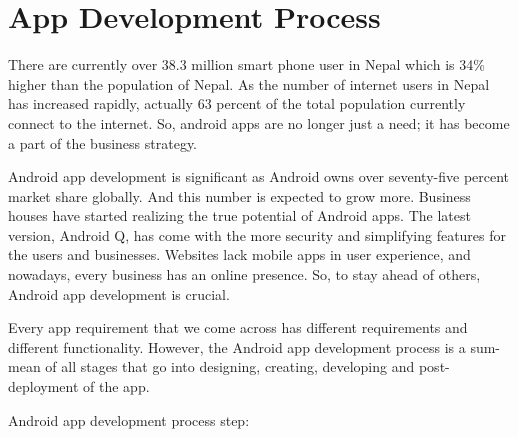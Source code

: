 \section{App Development Process}
There are currently over 38.3 million smart phone user in Nepal which is 34\% higher than the population of Nepal. As the number of internet users in Nepal has increased rapidly, actually 63 percent of the total population currently connect to the internet. So, android apps are no longer just a need; it has become a part of the business strategy.\par
Android app development is significant as Android owns over seventy-five percent market share globally. And this number is expected to grow more. Business houses have started realizing the true potential of Android apps. The latest version, Android Q, has come with the more security and simplifying features for the users and businesses. Websites lack mobile apps in user experience, and nowadays, every business has an online presence. So, to stay ahead of others, Android app development is crucial.\par

Every app requirement that we come across has different requirements and different functionality. 
However, the Android app development process is a sum-mean of all stages that go into designing, creating, developing and post-deployment of the app.

Android app development process step:

